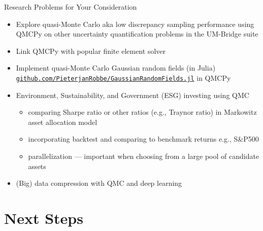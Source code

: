 \documentclass[10pt,compress,xcolor={usenames,dvipsnames},aspectratio=169]{beamer}
\begin{document}
\begin{frame}{Research Problems for Your Consideration}

\vspace{-5ex}
    \begin{itemize}
        \item Explore quasi-Monte Carlo aka low discrepancy sampling performance using QMCPy on other uncertainty quantification problems in the UM-Bridge suite 

        \item Link QMCPy with popular finite element solver \href{https://fenicsproject.org}{}

        \item Implement quasi-Monte Carlo Gaussian random fields (in Julia) \href{https://github.com/PieterjanRobbe/GaussianRandomFields.jl}{\nolinkurl{github.com/PieterjanRobbe/GaussianRandomFields.jl}} in QMCPy 

        \item  Environment, Sustainability, and Government (ESG) investing using QMC
        \begin{itemize}
        \item comparing Sharpe ratio or other ratios (e.g., Traynor ratio) in Markowitz asset allocation model
        \item incorporating backtest and comparing to benchmark returns e.g., S\&P500 
        \item parallelization --- important when choosing from a large pool of candidate assets
         \end{itemize}

        \item (Big) data compression with QMC and deep learning
    \end{itemize}
\end{frame}


\section{Next Steps}
\end{document}
